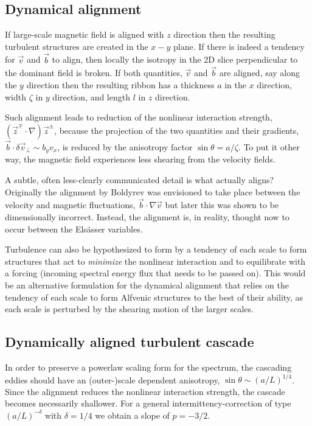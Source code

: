 \documentclass[usenatbib,twocolumn]{aastex63}
\begin{document}
\begin{appendix}
\subsection{Dynamical alignment}

If large-scale magnetic field is aligned with $z$ direction then the resulting turbulent structures are created in the $x-y$ plane.
If there is indeed a tendency for $\vec{v}$ and $\vec{b}$ to align, then locally the isotropy in the 2D slice perpendicular to the dominant field is broken.
If both quantities, $\vec{v}$ and $\vec{b}$ are aligned, say along the $y$ direction then the resulting ribbon has a thickness $a$ in the $x$ direction, width $\zeta$ in $y$ direction, and length $l$ in $z$ direction.

Such alignment leads to reduction of the nonlinear interaction strength, $(\vec{z}^\mp \cdot \nabla)\vec{z}^\pm$, because the projection of the two quantities and their gradients, $\vec{b}\cdot\delta\vec{v}_\perp \sim b_y v_x$, is reduced by the anisotropy factor $\sin\theta = a/\zeta$.
To put it other way, the magnetic field experiences less shearing from the velocity fields.

A subtle, often less-clearly communicated detail is what actually aligns?
Originally the alignment by Boldyrev was envisioned to take place between the velocity and magnetic fluctuations, $\vec{b} \cdot \nabla \vec{v}$ but later this was shown to be dimensionally incorrect. 
Instead, the alignment is, in reality, thought now to occur between the Els\"asser  variables. %


Turbulence can also be hypothesized to form by a tendency of each scale to form structures that act to \textit{minimize} the nonlinear interaction and to equilibrate with a forcing (incoming spectral energy flux that needs to be passed on).
This would be an alternative formulation for the dynamical alignment that relies on the tendency of each scale to form Alfvenic structures to the best of their ability, as each scale is perturbed by the shearing motion of the larger scales. 


\subsection{Dynamically aligned turbulent cascade}

In order to preserve a powerlaw scaling form for the spectrum, the cascading eddies should have an (outer-)scale dependent anisotropy, $\sin\theta \sim (a/L)^{1/4}$.
Since the alignment reduces the nonlinear interaction strength, the cascade becomes necessarily shallower.
For a general intermittency-correction of type $(a/L)^{-\delta}$ with $\delta = 1/4$ we obtain a slope of $p = -3/2$.


\end{appendix}
\end{document}
